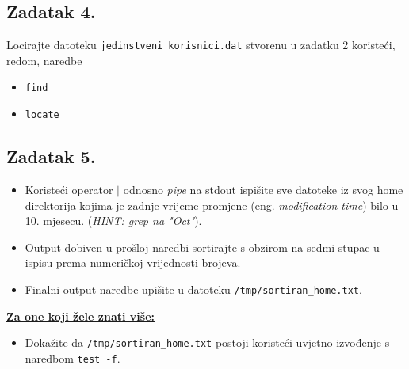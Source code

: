 \documentclass{exam}
\newcommand{\shell}[1]{\texttt{#1}}
\begin{document}
  \subsection*{Zadatak 4.}
  Locirajte datoteku \texttt{jedinstveni\_korisnici.dat} stvorenu u zadatku 2 koristeći, redom, naredbe
  \begin{itemize}
    \item \texttt{find}
    \item \texttt{locate}
\end{itemize}

    \subsection*{Zadatak 5.}
    \begin{itemize}
        \item Koristeći operator $\rvert$ odnosno \textit{pipe} na stdout ispišite sve datoteke iz svog home direktorija kojima je zadnje vrijeme promjene (eng. \textit{modification time}) bilo u 10. mjesecu. (\textit{HINT: grep na "Oct"}).
        \item Output dobiven u prošloj naredbi sortirajte s obzirom na sedmi stupac u ispisu prema numeričkoj vrijednosti brojeva.
        \item Finalni output naredbe upišite u datoteku \shell{/tmp/sortiran\_home.txt}.
    \end{itemize}
    
\underline{\textbf{Za one koji žele znati više:}}
\begin{itemize}
    \item Dokažite da \shell{/tmp/sortiran\_home.txt} postoji koristeći uvjetno izvođenje s naredbom \shell{test -f}.

\end{itemize}
\end{document}
